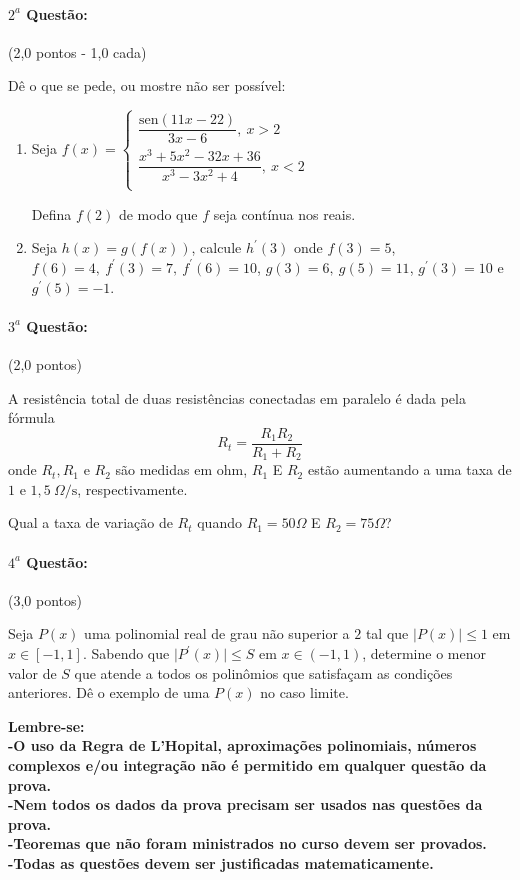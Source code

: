 \documentclass[12pt,a4paper]{article}
\begin{document}
\paragraph{$2^a$ Questão:}  (2,0 pontos - 1,0 cada)

Dê o que se pede, ou mostre não ser possível:

\begin{enumerate}[label=(\alph*)]

\item  Seja $f(x)=
\begin{cases}
 \dfrac{\textrm{sen}(11x-22)}{3x-6}, \ x>2 \\
 \dfrac{x^3+5x^2-32x+36}{x^3-3x^2+4}, \ x<2 \\
\end{cases}
$

Defina $f(2)$ de modo que $f$ seja contínua nos reais.
\item Seja $h(x)=g(f(x))$, calcule $h^\prime(3)$ onde $f(3)=5$,  $f(6)= 4, \ f^\prime(3)=7,  \ f^\prime(6)=10$, $g(3)=6, \ g(5)=11$, $g^\prime(3)=10$ e $g^\prime(5)=-1$. 
\end{enumerate}

\paragraph{$3^a$ Questão:} (2,0 pontos)

A resistência total de duas resistências conectadas em paralelo é dada pela fórmula 
$$R_t= \dfrac{R_1R_2}{R_1+R_2} $$
onde $R_t, R_1$ e $R_2$ são medidas em ohm, $R_1$ E $R_2$  estão aumentando a uma taxa de $1$ e $1,5 \ \Omega\textrm{/s}$, respectivamente. 

Qual a taxa de variação de $R_t$ quando $R_1=50\Omega$ E $R_2=75\Omega$? 

\paragraph{$4^a$ Questão:} (3,0 pontos)

Seja $P(x)$ uma polinomial real de grau não superior a $2$ tal que $\vert P(x) \vert \leq 1$ em $x\in [-1,1]$. Sabendo que $\vert P^\prime(x) \vert \leq S $  em $x \in (-1,1)$,  determine o menor  valor de $S$ que atende a todos os polinômios que satisfaçam as condições anteriores. Dê o exemplo de uma $P(x)$ no caso limite.

\noindent \textbf{Lembre-se: \\ -O uso da Regra de L'Hopital, aproximações polinomiais, números complexos e/ou integração não é permitido em qualquer questão da prova. \\ -Nem todos os dados da prova precisam ser usados nas questões da prova. \\ -Teoremas que não foram ministrados no curso devem ser provados. \\ -Todas as questões devem ser justificadas matematicamente.}
 \newpage
\end{document}
